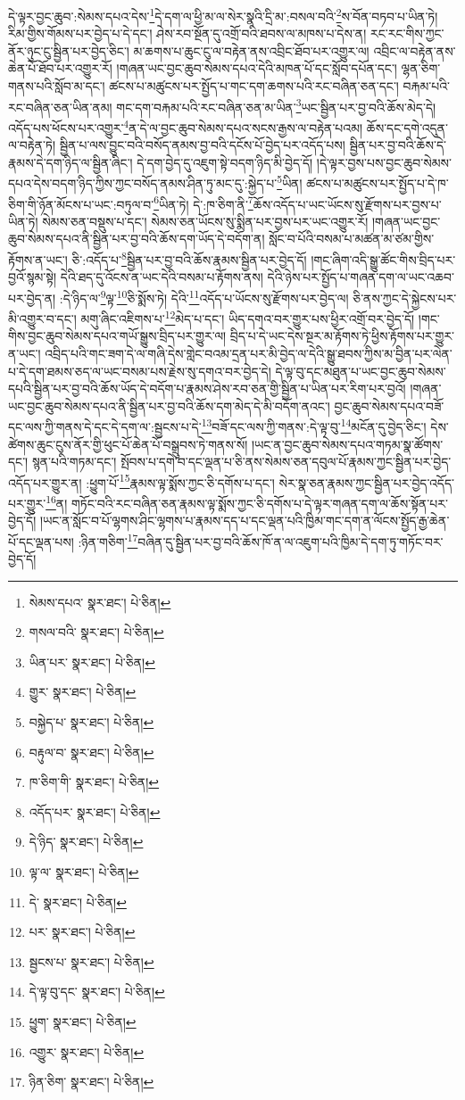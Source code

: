དེ་ལྟར་བྱང་ཆུབ་:སེམས་དཔའ་དེས་\footnote{སེམས་དཔའ་  སྣར་ཐང་།  པེ་ཅིན། }དེ་དག་ལ་ཕྱི་མ་ལ་སེར་སྣའི་དྲི་མ་:བསལ་བའི་\footnote{གསལ་བའི་  སྣར་ཐང་།  པེ་ཅིན། }ས་བོན་བཏབ་པ་ཡིན་ཏེ། རིམ་གྱིས་གོམས་པར་བྱེད་པ་དེ་དང་། ཤེས་རབ་སྔོན་དུ་འགྲོ་བའི་ཐབས་ལ་མཁས་པ་དེས་ན། རང་རང་གིས་ཀྱང་ནོར་ཉུང་ངུ་སྦྱིན་པར་བྱེད་ཅིང་། མ་ཆགས་པ་ཆུང་ངུ་ལ་བརྟེན་ནས་འབྲིང་ཐོབ་པར་འགྱུར་ལ། འབྲིང་ལ་བརྟེན་ནས་ཆེན་པོ་ཐོབ་པར་འགྱུར་རོ། །གཞན་ཡང་བྱང་ཆུབ་སེམས་དཔའ་དེའི་མཁན་པོ་དང་སློབ་དཔོན་དང་། ལྷན་ཅིག་གནས་པའི་སློབ་མ་དང་། ཚངས་པ་མཚུངས་པར་སྤྱོད་པ་གང་དག་ཆགས་པའི་རང་བཞིན་ཅན་དང་། བརྐམ་པའི་རང་བཞིན་ཅན་ཡིན་ནམ། གང་དག་བརྐམ་པའི་རང་བཞིན་ཅན་མ་ཡིན་\footnote{ཡིན་པར་  སྣར་ཐང་།  པེ་ཅིན། }ཡང་སྦྱིན་པར་བྱ་བའི་ཆོས་མེད་དེ། འདོད་པས་ཕོངས་པར་འགྱུར་\footnote{གྱུར་  སྣར་ཐང་།  པེ་ཅིན། }ན་དེ་ལ་བྱང་ཆུབ་སེམས་དཔའ་སངས་རྒྱས་ལ་བརྟེན་པའམ། ཆོས་དང་དགེ་འདུན་ལ་བརྟེན་ཏེ། སྦྱིན་པ་ལས་བྱུང་བའི་བསོད་ནམས་བྱ་བའི་དངོས་པོ་བྱེད་པར་འདོད་པས། སྦྱིན་པར་བྱ་བའི་ཆོས་དེ་རྣམས་དེ་དག་ཉིད་ལ་སྦྱིན་ཞིང་། དེ་དག་བྱེད་དུ་འཇུག་སྟེ་བདག་ཉིད་མི་བྱེད་དོ། །དེ་ལྟར་བྱས་པས་བྱང་ཆུབ་སེམས་དཔའ་དེས་བདག་ཉིད་ཀྱིས་ཀྱང་བསོད་ནམས་ཤིན་ཏུ་མང་དུ་:སྐྱེད་པ་\footnote{བསྐྱེད་པ་  སྣར་ཐང་།  པེ་ཅིན། }ཡིན། ཚངས་པ་མཚུངས་པར་སྤྱོད་པ་དེ་ཁ་ཅིག་གི་ཉོན་མོངས་པ་ཡང་:བཏུལ་བ་\footnote{བརྟུལ་བ་  སྣར་ཐང་།  པེ་ཅིན། }ཡིན་ཏེ། དེ་:ཁ་ཅིག་ནི་\footnote{ཁ་ཅིག་གི་  སྣར་ཐང་།  པེ་ཅིན། }ཆོས་འདོད་པ་ཡང་ཡོངས་སུ་རྫོགས་པར་བྱས་པ་ཡིན་ཏེ། སེམས་ཅན་བསྡུས་པ་དང་། སེམས་ཅན་ཡོངས་སུ་སྨིན་པར་བྱས་པར་ཡང་འགྱུར་རོ། །གཞན་ཡང་བྱང་ཆུབ་སེམས་དཔའ་ནི་སྦྱིན་པར་བྱ་བའི་ཆོས་དག་ཡོད་དེ་བདོག་ན། སློང་བ་པོའི་བསམ་པ་མཚན་མ་ཙམ་གྱིས་རྟོགས་ན་ཡང་། ཅི་:འདོད་པ་\footnote{འདོད་པར་  སྣར་ཐང་།  པེ་ཅིན། }སྦྱིན་པར་བྱ་བའི་ཆོས་རྣམས་སྦྱིན་པར་བྱེད་དོ། །གང་ཞིག་འདི་སྒྱུ་ཚོང་གིས་བྲིད་པར་བྱའོ་སྙམ་སྟེ། དེའི་ཐད་དུ་འོངས་ན་ཡང་དེའི་བསམ་པ་རྟོགས་ནས། དེའི་ཉེས་པར་སྤྱོད་པ་གཞན་དག་ལ་ཡང་འཆབ་པར་བྱེད་ན། :དེ་ཉིད་ལ་\footnote{དེ་ཉིད་  སྣར་ཐང་།  པེ་ཅིན། }ལྟ་\footnote{ལྟ་ལ་  སྣར་ཐང་།  པེ་ཅིན། }ཅི་སྨོས་ཏེ། དེའི་\footnote{དེ་  སྣར་ཐང་།  པེ་ཅིན། }འདོད་པ་ཡོངས་སུ་རྫོགས་པར་བྱེད་ལ། ཅི་ནས་ཀྱང་དེ་སྐྱེངས་པར་མི་འགྱུར་བ་དང་། མགུ་ཞིང་འཇིགས་པ་\footnote{པར་  སྣར་ཐང་།  པེ་ཅིན། }མེད་པ་དང་། ཡིད་དགའ་བར་གྱུར་པས་ཕྱིར་འགྲོ་བར་བྱེད་དོ། །གང་གིས་བྱང་ཆུབ་སེམས་དཔའ་གཡོ་སྒྱུས་བྲིད་པར་གྱུར་ལ། བྲིད་པ་དེ་ཡང་དེས་སྔར་མ་རྟོགས་ཏེ་ཕྱིས་རྟོགས་པར་གྱུར་ན་ཡང་། འབྲིད་པའི་གང་ཟག་དེ་ལ་གཞི་དེས་གླེང་བའམ་དྲན་པར་མི་བྱེད་ལ་དེའི་སྒྱུ་ཐབས་ཀྱིས་མ་བྱིན་པར་ལེན་པ་དེ་དག་ཐམས་ཅད་ལ་ཡང་བསམ་པས་རྗེས་སུ་དགའ་བར་བྱེད་དེ། དེ་ལྟ་བུ་དང་མཐུན་པ་ཡང་བྱང་ཆུབ་སེམས་དཔའི་སྦྱིན་པར་བྱ་བའི་ཆོས་ཡོད་དེ་བདོག་པ་རྣམས་ཤེས་རབ་ཅན་གྱི་སྦྱིན་པ་ཡིན་པར་རིག་པར་བྱའོ། །གཞན་ཡང་བྱང་ཆུབ་སེམས་དཔའ་ནི་སྦྱིན་པར་བྱ་བའི་ཆོས་དག་མེད་དེ་མི་བདོག་ནའང་། བྱང་ཆུབ་སེམས་དཔའ་བཟོ་དང་ལས་ཀྱི་གནས་དེ་དང་དེ་དག་ལ་:སྦྱངས་པ་དེ་\footnote{སྦྱངས་པ་  སྣར་ཐང་།  པེ་ཅིན། }བཟོ་དང་ལས་ཀྱི་གནས་:དེ་ལྟ་བུ་\footnote{དེ་ལྟ་བུ་དང་  སྣར་ཐང་།  པེ་ཅིན། }མངོན་དུ་བྱེད་ཅིང་། དེས་ཚེགས་ཆུང་ངུས་ནོར་གྱི་ཕུང་པོ་ཆེན་པོ་བསྒྲུབས་ཏེ་གནས་སོ། །ཡང་ན་བྱང་ཆུབ་སེམས་དཔའ་གཏམ་སྣ་ཚོགས་དང་། སྙན་པའི་གཏམ་དང་། སྤོབས་པ་དགེ་བ་དང་ལྡན་པ་ཅི་ནས་སེམས་ཅན་དབུལ་པོ་རྣམས་ཀྱང་སྦྱིན་པར་བྱེད་འདོད་པར་གྱུར་ན། :ཕྱུག་པོ་\footnote{ཕྱུག་  སྣར་ཐང་།  པེ་ཅིན། }རྣམས་ལྟ་སྨོས་ཀྱང་ཅི་དགོས་པ་དང་། སེར་སྣ་ཅན་རྣམས་ཀྱང་སྦྱིན་པར་བྱེད་འདོད་པར་གྱུར་\footnote{འགྱུར་  སྣར་ཐང་།  པེ་ཅིན། }ན། གཏོང་བའི་རང་བཞིན་ཅན་རྣམས་ལྟ་སྨོས་ཀྱང་ཅི་དགོས་པ་དེ་ལྟར་གཞན་དག་ལ་ཆོས་སྟོན་པར་བྱེད་དོ། །ཡང་ན་སློང་བ་པོ་ལྷགས་ཤིང་ལྷགས་པ་རྣམས་དད་པ་དང་ལྡན་པའི་ཁྱིམ་གང་དག་ན་ལོངས་སྤྱོད་རྒྱ་ཆེན་པོ་དང་ལྡན་པས། :ཉིན་གཅིག་\footnote{ཉིན་ཅིག་  སྣར་ཐང་།  པེ་ཅིན། }བཞིན་དུ་སྦྱིན་པར་བྱ་བའི་ཆོས་ཁོ་ན་ལ་འཇུག་པའི་ཁྱིམ་དེ་དག་ཏུ་གཏོང་བར་བྱེད་དོ། 